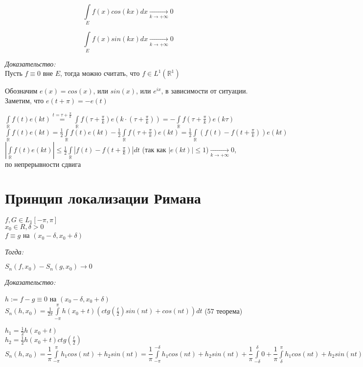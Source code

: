 \documentclass[paper=a4, fontsize=17pt]{article}
\begin{document}
$$\int\limits_{E}f(x)cos(kx)dx \xrightarrow[k \to +\infty]{} 0$$

$$\int\limits_{E}f(x)sin(kx)dx \xrightarrow[k \to +\infty]{} 0$$

\emph{Доказательство:} \\
Пусть $f \equiv 0$ вне $E$, тогда можно считать, что $f \in L^1(\mathds{R}^1)$

Обозначим $e(x) = cos(x)$, или $sin(x)$, или $e^{ix}$, в зависимости от ситуации. Заметим, что $e(t + \pi) = -e(t)$

$\int\limits_{\mathds{R}}f(t)e(kt)  {\overset{t=\tau + \frac{\pi}{k}}{=}} \int\limits_{\mathds{R}}f(\tau + \frac{\pi}{k})e(k \cdot (\tau + \frac{\pi}{k})) = -\int\limits_{\mathds{R}}f(\tau + \frac{\pi}{k})e(k \tau)$ \\
$\int\limits_{\mathds{R}}f(t)e(kt) = \frac{1}{2}\int\limits_{\mathds{R}}f(t)e(kt) - \frac{1}{2}\int\limits_{\mathds{R}}f(\tau + \frac{\pi}{k})e(kt) = \frac{1}{2}\int\limits_{\mathds{R}}(f(t) - f(t + \frac{\pi}{k})) e(kt)$ \\

$|\int\limits_{\mathds{R}}f(t)e(kt)| \leq\frac{1}{2}\int\limits_{\mathds{R}}|f(t) - f(t + \frac{\pi}{k})|dt$ (так как $|e(kt)| \leq 1$)$ \xrightarrow[k \to +\infty]{}0$,\\по непрерывности сдвига

\section{Принцип локализации Римана}

$ f, G \in L_1[-\pi, \pi] $\\
$ x_0 \in R, \delta > 0 $\\
$ f \equiv g $ на $ (x_0 - \delta, x_0 + \delta) $

\emph{Тогда:}

$ S_n(f, x_0) - S_n(g, x_0) \to 0 $

\emph{Доказательство:}

$ h := f - g \equiv 0 $ на $ (x_0 - \delta, x_0 + \delta) $\\
$ S_n(h, x_0) = \frac{1}{2\pi} \int\limits_{-\pi}^{\pi} h(x_0 + t) (ctg(\frac{t}{2}) sin(nt) + cos(nt)) dt $ (57 теорема)

$ h_1 = \frac{1}{2} h(x_0 + t) $\\
$ h_2 = \frac{1}{2} h(x_0 + t) ctg(\frac{t}{2}) $\\
$S_n(h, x_0) = \dfrac{1}{\pi}\int\limits_{-\pi}^{\pi} h_1 cos(nt) + h_2 sin(nt) = \dfrac{1}{\pi}\int\limits_{-\pi}^{-\delta} h_1 cos(nt) + h_2 sin(nt) + \dfrac{1}{\pi}\int\limits_{-\delta}^{\delta} 0 + \dfrac{1}{\pi}\int\limits_{\delta}^{\pi} h_1 cos(nt) + h_2 sin(nt)$
\end{document}
